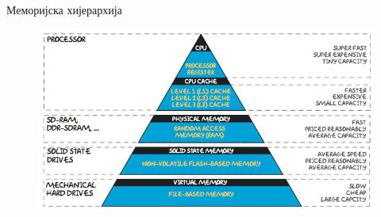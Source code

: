 \documentclass[xcolor=table]{beamer}
\begin{document}
\begin{frame}[allowframebreaks]{Меморијска хијерархија}
        \begin{figure}
            \centering
            \includegraphics[width=\textwidth,height=0.7\textheight,keepaspectratio]{images/mem1.jpg}
            \label{fig:mem1}
        \end{figure}
    \end{frame}
    
\end{document}

